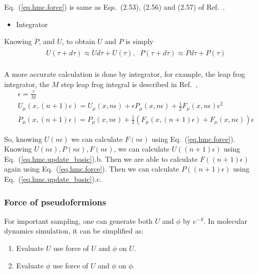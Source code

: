 Eq.~(\ref{eq.hmc.force}) is same as Eqs.~(2.53), (2.56) and (2.57) of Ref.~\cite{latticeqcdbook2017}.

\begin{itemize}
\item {}Integrator
\end{itemize}

Knowing $\dot{P}$, and $\dot {U}$, to obtain $U$ and $P$ is simply
\begin{equation}
\begin{split}
&U(\tau+d\tau)\approx \dot{U}d\tau + U(\tau),\;\;P(\tau+d\tau)\approx \dot{P}d\tau + P(\tau)\\
\end{split}
\end{equation}

A more accurate calculation is done by integrator, for example, the leap frog integrator, the $M$ step leap frog integral is described in Ref.~\cite{latticeqcdbook2010},
\begin{subequations}
\begin{eqnarray}
&\epsilon = \frac{\tau}{M}\\
&U_{\mu}(x,(n+1)\epsilon)=U_{\mu}(x,n\epsilon)+\epsilon P_{\mu}(x,n\epsilon)+\frac{1}{2}F_{\mu}(x,n\epsilon)\epsilon ^2\\
&P_{\mu}(x,(n+1)\epsilon)=P_{\mu}(x,n\epsilon)+\frac{1}{2}\left(F_{\mu}(x,(n+1)\epsilon)+F_{\mu}(x,n\epsilon)\right)\epsilon
\end{eqnarray}
\label{eq.hmc.update_basic}
\end{subequations}

So, knowing $U(n\epsilon)$ we can calculate $F(n\epsilon)$ using Eq.~(\ref{eq.hmc.force}).
Knowing $U(n\epsilon),P(n\epsilon),F(n\epsilon)$, we can calculate $U((n+1)\epsilon)$ using Eq.~(\ref{eq.hmc.update_basic}).b.
Then we are able to calculate $F((n+1)\epsilon)$ again using Eq.~(\ref{eq.hmc.force}).
Then we can calculate $P((n+1)\epsilon)$ using Eq.~(\ref{eq.hmc.update_basic}).c.

\subsubsection{\label{forceOfPseudofermions}Force of pseudofermions}

For important sampling, one can generate both $U$ and $\phi$ by $e^{-S}$. In molecular dynamics simulation, it can be simplified as:

\begin{enumerate}
  \item Evaluate $U$ use force of $U$ and $\phi$ on $U$.
  \item Evaluate $\phi$ use force of $U$ and $\phi$ on $\phi$.
\end{enumerate}

